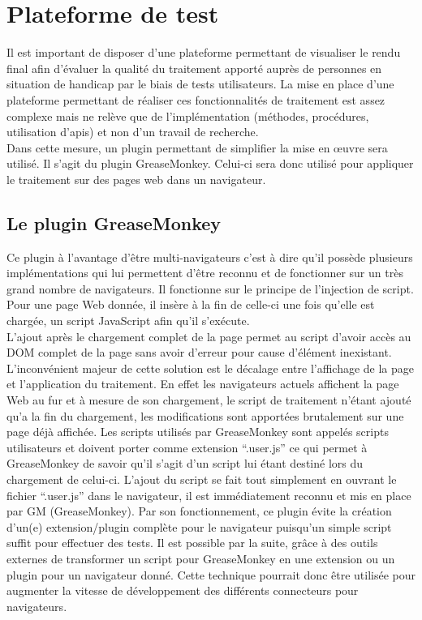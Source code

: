 \documentclass[french,a4paper]{report}
\begin{document}
{\section{Plateforme de test}
Il est important de disposer d'une plateforme permettant de visualiser
le rendu final afin d'évaluer la qualité du traitement apporté auprès
de personnes en situation de handicap par le biais de tests
utilisateurs. La mise en place d'une plateforme permettant de réaliser
ces fonctionnalités de traitement est assez complexe mais ne relève
que de l'implémentation (méthodes, procédures, utilisation
d'\glspl{api}) et non d'un travail de recherche.
\\
Dans cette mesure, un plugin permettant de simplifier la mise en œuvre
sera utilisé. Il s'agit du plugin GreaseMonkey. Celui-ci sera donc
utilisé pour appliquer le traitement sur des pages web dans un
navigateur.
\subsection{Le plugin GreaseMonkey}
Ce plugin à l'avantage d'être multi-navigateurs c'est à dire qu'il
possède plusieurs implémentations qui lui permettent d'être reconnu et
de fonctionner sur un très grand nombre de navigateurs. Il fonctionne sur
le principe de l'injection de script. Pour une page Web donnée, il
insère à la fin de celle-ci une fois qu'elle est chargée,
un script JavaScript afin qu'il s'exécute. \\
L'ajout après le chargement complet de la page permet au script
d'avoir accès au DOM complet de la page sans avoir d'erreur pour cause
d'élément inexistant. L'inconvénient majeur de cette solution est
le décalage entre l'affichage de la page et l'application du
traitement. En effet les navigateurs actuels affichent la page Web au
fur et à mesure de son chargement, le script de traitement n'étant
ajouté qu'a la fin du chargement, les modifications sont apportées
brutalement sur une page déjà affichée. \newline
Les scripts utilisés par GreaseMonkey sont appelés scripts
utilisateurs et doivent porter comme extension \enquote{.user.js} ce qui
permet à GreaseMonkey de savoir qu'il s'agit d'un script lui étant
destiné lors du chargement de celui-ci. L'ajout du script se fait
tout simplement en ouvrant le fichier \enquote{.user.js} dans le navigateur,
il est immédiatement reconnu et mis en place par GM (GreaseMonkey).
\newline
Par son fonctionnement, ce plugin évite la création d'un(e)
extension/plugin complète pour le navigateur puisqu'un simple script
suffit pour effectuer des tests. \newline
Il est possible par la suite, grâce à des outils externes de
transformer un script pour GreaseMonkey en une extension ou un plugin pour un
navigateur donné. Cette technique pourrait donc être utilisée pour
augmenter la vitesse de développement des différents connecteurs pour
navigateurs. \newline
}
\end{document}
